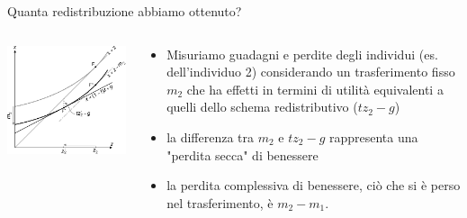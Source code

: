 \documentclass[11pt]{beamer}
\begin{document}
\begin{frame}{Quanta redistribuzione abbiamo ottenuto?}
\begin{columns}
\begin{column}{.55\columnwidth}
\begin{center}
\includegraphics[width=\textwidth]{./figure/effetto-distorsivo-imposte-ql-4.pdf}
\end{center}
\end{column}


\begin{column}{.45\columnwidth}
\begin{itemize}
\item Misuriamo guadagni e perdite degli individui (es. dell'individuo 2)
considerando un trasferimento fisso $m_2$ che ha effetti in termini di
utilità equivalenti a quelli dello schema redistributivo ($tz_2-g$)
\item la differenza tra $m_2$ e $tz_2-g$ rappresenta una "perdita secca" di
benessere
\item la perdita complessiva di benessere, ciò che si è perso nel
trasferimento, è $m_2-m_1$.
\end{itemize}
\end{column}
\end{columns}
\end{frame}
\end{document}
